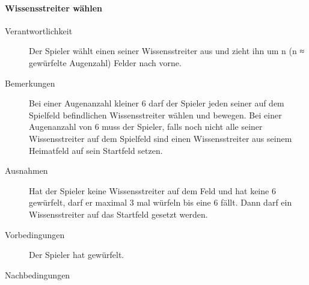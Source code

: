 \documentclass{report}
\begin{document}
\paragraph{Wissensstreiter wählen}
\begin{description}
	\item[Verantwortlichkeit] Der Spieler wählt einen seiner Wissensstreiter aus und zieht ihn um n (n ≈ gewürfelte Augenzahl) Felder nach vorne.
	\item[Bemerkungen] Bei einer Augenanzahl kleiner 6 darf der Spieler jeden seiner auf dem Spielfeld befindlichen Wissensstreiter wählen und bewegen. Bei einer Augenanzahl von 6 muss der Spieler, falls noch nicht alle seiner Wissensstreiter auf dem Spielfeld sind einen Wissensstreiter aus seinem Heimatfeld auf sein Startfeld setzen.
	\item[Ausnahmen] Hat der Spieler keine Wissensstreiter auf dem Feld und hat keine 6 gewürfelt, darf er maximal 3 mal würfeln bis eine 6 fällt. Dann darf ein Wissensstreiter auf das Startfeld gesetzt werden.
	\item[Vorbedingungen] Der Spieler hat gewürfelt.
	\item[Nachbedingungen]
\end{description}
\end{document}
